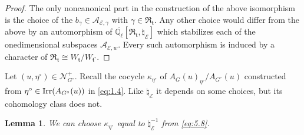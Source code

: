 \documentclass[11pt]{amsart}
\newtheorem{lem}[thm]{Lemma}
\theoremstyle{definition}
\newcommand{\mc}{\mathcal}
\newcommand{\Q}{\mathbb Q}
\def\Irr{{\rm Irr}}
\def\cN{{\mathcal N}}
\def\cE{{\mathcal E}}
\def\cR{{\mathfrak R}}
\def\ft{{\mathfrak t}}
\begin{document}
\begin{proof}
The only noncanonical part in the construction of the above isomorphism is the
choice of the $b_\gamma \in \mc A_{\cE,\gamma}$ with $\gamma \in \cR_\ft$. 
Any other choice would differ from the above by an automorphism of 
$\overline{\Q_{\ell}}[\cR_\ft,\natural_\cE]$ which stabilizes each of the onedimensional 
subspaces $\mc A_{\cE,w}$. Every such automorphism is induced by a character of
$\cR_\ft \cong W_\ft / W_{\ft^\circ}$.
\end{proof}

Let $(u,\eta^\circ) \in \cN_{G^\circ}^+$.
Recall the cocycle $\kappa_{\eta^\circ}$ of $A_G (u)_{\eta^\circ} / A_{G^\circ}(u)$
constructed from $\eta^\circ \in \Irr (A_{G^\circ}(u))$ in \eqref{eq:1.4}. Like 
$\natural_\cE$ it depends on some choices, but its cohomology class does not.

\begin{lem}\label{lem:5.4}
We can choose $\kappa_{\eta^\circ}$ equal to $\natural_\cE^{-1}$ from \eqref{eq:5.8}.
\end{lem}
\end{document}
